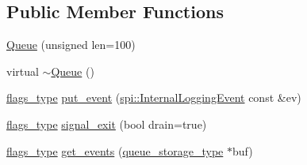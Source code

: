 \subsection*{Public Member Functions}
\begin{DoxyCompactItemize}
\item 
\hyperlink{classlog4cplus_1_1thread_1_1Queue_a3772c2bd390108c4af17a64cda72227b}{Queue} (unsigned len=100)
\item 
virtual \hyperlink{classlog4cplus_1_1thread_1_1Queue_af3d7ec44d9f8becdc60c105d075c657c}{$\sim$\-Queue} ()
\item 
\hyperlink{classlog4cplus_1_1thread_1_1Queue_a6abff6eb8b4963c0ecf3e1ed67622490}{flags\-\_\-type} \hyperlink{classlog4cplus_1_1thread_1_1Queue_a9b7c45653c3ca9b12772bc2c9366b1a2}{put\-\_\-event} (\hyperlink{classlog4cplus_1_1spi_1_1InternalLoggingEvent}{spi\-::\-Internal\-Logging\-Event} const \&ev)
\item 
\hyperlink{classlog4cplus_1_1thread_1_1Queue_a6abff6eb8b4963c0ecf3e1ed67622490}{flags\-\_\-type} \hyperlink{classlog4cplus_1_1thread_1_1Queue_a21b891c03e23d926b54abaae5e884599}{signal\-\_\-exit} (bool drain=true)
\item 
\hyperlink{classlog4cplus_1_1thread_1_1Queue_a6abff6eb8b4963c0ecf3e1ed67622490}{flags\-\_\-type} \hyperlink{classlog4cplus_1_1thread_1_1Queue_ae68bb360541e30f46b6c0c6508953356}{get\-\_\-events} (\hyperlink{classlog4cplus_1_1thread_1_1Queue_af9d2a870aac3a6cbf38e702bcc163741}{queue\-\_\-storage\-\_\-type} $\ast$buf)
\end{DoxyCompactItemize}
